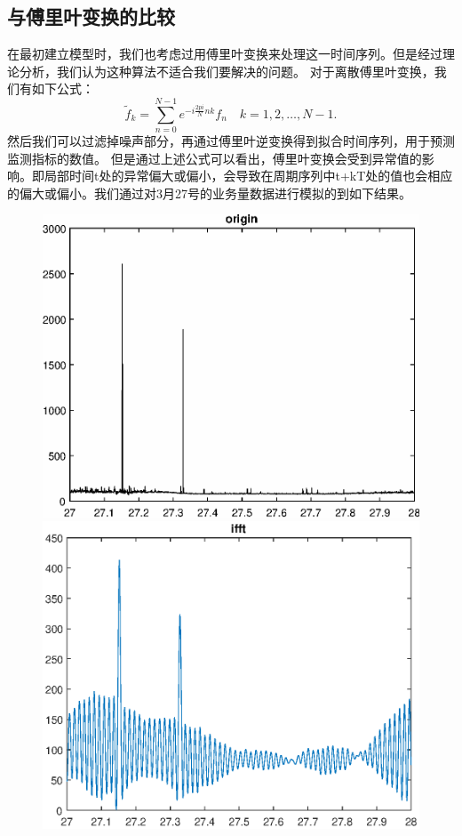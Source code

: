 \documentclass[a4paper]{article}
\begin{document}
\subsection{与傅里叶变换的比较}
\indent 在最初建立模型时，我们也考虑过用傅里叶变换来处理这一时间序列。但是经过理论分析，我们认为这种算法不适合我们要解决的问题。
\indent 对于离散傅里叶变换，我们有如下公式：
\begin{equation}
\tilde f_k=\sum_{n=0}^{N-1}e^{-i\frac{2pi}{N}nk}f_n  \quad k=1,2,\dots,N-1.
\end{equation}
然后我们可以过滤掉噪声部分，再通过傅里叶逆变换得到拟合时间序列，用于预测监测指标的数值。
但是通过上述公式可以看出，傅里叶变换会受到异常值的影响。即局部时间t处的异常偏大或偏小，会导致在周期序列中t+kT处的值也会相应的偏大或偏小。我们通过对3月27号的业务量数据进行模拟的到如下结果。
\begin{figure}[h]
	\begin{minipage}[t]{0.5\linewidth}
    \centering
    \includegraphics[scale=0.4]{pic/before_friouer.eps}
    \end{minipage}
    \begin{minipage}[t]{0.5\linewidth}
    \centering 
	\includegraphics[scale=0.4]{pic/friouer.eps}

\end{minipage}
\end{figure}
\end{document}
